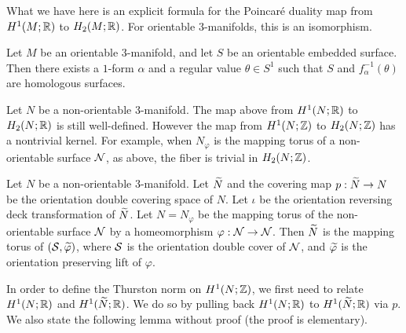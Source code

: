What we have here is an explicit formula for the Poincar\'e duality map from $H^1(M; \mathbb{R})$ to $H_2(M; \mathbb{R})$.
For orientable $3$-manifolds, this is an isomorphism.%
\begin{thm}
  \label{thm:orientable-poincare-duality}
  Let $M$ be an orientable $3$-manifold, and let $S$ be an orientable embedded surface. Then there exists a $1$-form
  $\alpha$ and a regular value $\theta \in S^1$ such that $S$ and $f_{\alpha}^{-1}(\theta)$ are homologous surfaces.
\end{thm}

Let $N$ be a non-orientable 3-manifold.  The map above from $H^1(N;\mathbb{R})$ to $H_2(N;\mathbb{R})$ is still well-defined.
However the map from $H^1(N; \mathbb{Z})$ to $H_2(N; \mathbb{Z})$ has a nontrivial kernel.  For example, when $N_{\varphi}$ is the mapping torus of a non-orientable surface $\mathcal{N}$, as above, the fiber is trivial in $H_2(N;\mathbb{Z})$.

Let $N$ be a non-orientable $3$-manifold.  Let $\widetilde{N}$ and the covering map $p:\widetilde{N}\rightarrow N$ be the orientation double covering space of $N$.
Let $\iota$ be the orientation reversing deck transformation
of $\widetilde{N}$.
Let $N=N_\varphi$ be the mapping torus of the non-orientable surface $\mathcal{N}$ by a homeomorphism $\varphi: \mathcal{N} \to \mathcal{N}$. Then $\widetilde{N}$ is the mapping torus of $(\mathcal{S}, \widetilde{\varphi})$, where $\mathcal{S}$ is the orientation double cover of $\mathcal{N}$, and $\widetilde{\varphi}$ is the orientation preserving lift of $\varphi$.

 In order to define the Thurston norm on $H^1(N;\mathbb{Z})$, we first need to relate $H^1(N; \mathbb{R})$ and $H^1(\widetilde{N}; \mathbb{R})$.
We do so by pulling back $H^1(N;\mathbb{R})$ to $H^1(\widetilde{N};\mathbb{R})$ via $p$. We also state the following lemma without proof (the proof is elementary).

